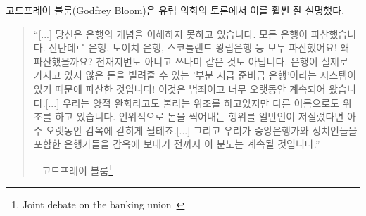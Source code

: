 \begin{comment}
	Godfrey Bloom, addressing the European Parliament during a joint
	debate, said it way better than I ever could:
\end{comment}
고드프레이 블룸(Godfrey Bloom)은 유럽 의회의 토론에서 이를 훨씬 잘 설명했다.

\begin{comment}
	\begin{quotation}\begin{samepage}
			\enquote{[...] you do not really understand the concept of banking. All the
				banks are broke. Bank Santander, Deutsche Bank, Royal Bank of
				Scotland --- they're all broke! And why are they broke? It isn't an
				act of God. It isn't some sort of tsunami. They're broke because we
				have a system called `fractional reserve banking' which means that
				banks can lend money that they don't actually have! It's a criminal
				scandal and it's been going on for too long. [...]
				We have counterfeiting --- sometimes called quantitative
				easing --- but counterfeiting by any other name. The artificial
				printing of money which, if any ordinary person did, they'd go to
				prison for a very long time [...] and until we start sending
				bankers --- and I include central bankers and politicians --- to
				prison for this outrage it will continue.}
			\begin{flushright} -- Godfrey Bloom\footnote{Joint debate on the
					banking union~\cite{godfrey-bloom}}
	\end{flushright}\end{samepage}\end{quotation}
\end{comment}
\begin{quotation}\begin{samepage}
		\enquote{[...] 당신은 은행의 개념을 이해하지 못하고 있습니다. 
			모든 은행이 파산했습니다. 산탄데르 은행, 도이치 은행, 스코틀랜드 왕립은행 등 모두 파산했어요!
			왜 파산했을까요? 천재지변도 아니고 쓰나미 같은 것도 아닙니다. 
			은행이 실제로 가지고 있지 않은 돈을 빌려줄 수 있는 '부분 지급 준비금 은행'이라는 시스템이 있기 때문에 파산한 것입니다! 
			이것은 범죄이고 너무 오랫동안 계속되어 왔습니다.[...]	
			우리는 양적 완화라고도 불리는 위조를 하고있지만 다른 이름으로도 위조를 하고 있습니다.
			인위적으로 돈을 찍어내는 행위를 일반인이 저질렀다면 아주 오랫동안 감옥에 갇히게 될테죠.[...] 
			그리고 우리가 중앙은행가와 정치인들을 포함한 은행가들을 감옥에 보내기 전까지 이 분노는 계속될 것입니다.}
		\begin{flushright} -- 고드프레이 블룸\footnote{Joint debate on the
				banking union~\cite{godfrey-bloom}}
\end{flushright}\end{samepage}\end{quotation}

